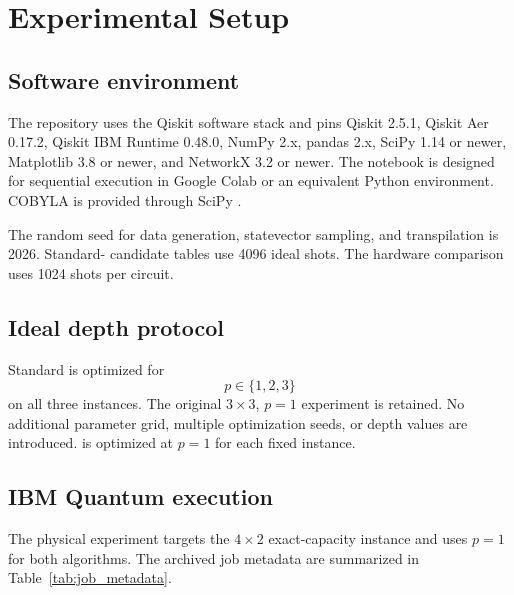 \section{Experimental Setup}

\subsection{Software environment}

The repository uses the Qiskit software stack \cite{qiskit} and pins Qiskit 2.5.1, Qiskit Aer 0.17.2, Qiskit IBM Runtime 0.48.0, NumPy 2.x, pandas 2.x, SciPy 1.14 or newer, Matplotlib 3.8 or newer, and NetworkX 3.2 or newer. The notebook is designed for sequential execution in Google Colab or an equivalent Python environment. COBYLA is provided through SciPy \cite{virtanen2020}.

The random seed for data generation, statevector sampling, and transpilation is 2026. Standard-\QAOA{} candidate tables use 4096 ideal shots. The hardware comparison uses 1024 shots per circuit.

\subsection{Ideal depth protocol}

Standard \QAOA{} is optimized for
\begin{equation}
p\in\{1,2,3\}
\end{equation}
on all three instances. The original $3\times3$, $p=1$ experiment is retained. No additional parameter grid, multiple optimization seeds, or depth values are introduced. \GMQAOA{} is optimized at $p=1$ for each fixed instance.

\subsection{IBM Quantum execution}

The physical experiment targets the $4\times2$ exact-capacity instance and uses $p=1$ for both algorithms. The archived job metadata are summarized in Table~\ref{tab:job_metadata}.

